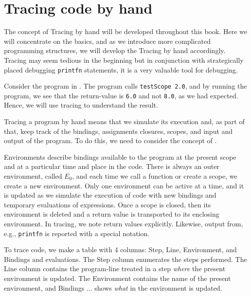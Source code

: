 \documentclass[fsharpNotes.tex]{subfiles}
\begin{document}
\section{Tracing code by hand}
The concept of Tracing by hand will be developed throughout this book. Here we will concentrate on the basics, and as we introduce more complicated programming structures, we will develop the Tracing by hand accordingly. Tracing may seem tedious in the beginning but in conjunction with strategically placed debugging \lstinline!printfn! statements, it is a very valuable tool for debugging.

Consider the program in .
%
%
The program calls \lstinline{testScope 2.0}, and by running the program, we see that the return-value is \lstinline{6.0} and not \lstinline{8.0}, as we had expected. Hence, we will use tracing to understand the result.

Tracing a program by hand means that we simulate its execution and, as part of that, keep track of the bindings, assignments closures, scopes, and input and output of the program. To do this, we need to consider the concept of .

Environments describe bindings available to the program at the present scope and at a particular time and place in the code. There is always an outer environment, called $E_0$, and each time we call a function or create a scope, we create a new environment. Only one environment can be active at a time, and it is updated as we simulate the execution of code with new bindings and temporary evaluations of expressions. Once a scope is closed, then its environment is deleted and a return value is transported to its enclosing environment. In tracing, we note return values explicitly. Likewise, output from, e.g., \lstinline{printfn} is reported with a special notation.

To trace code, we make a table with 4 columns: Step, Line, Environment, and Bindings and evaluations. The Step column enumerates the steps performed. The Line column contains the program-line treated in a step {\em where} the present environment is updated. The Environment contains the name of the present environment, and Bindings $\ldots$ shows {\em what}  in the environment is updated.
\end{document}

